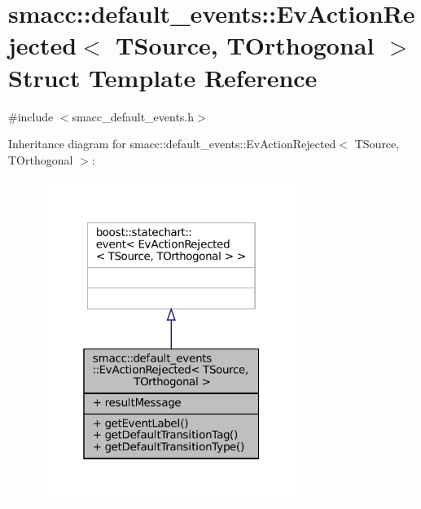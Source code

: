 \hypertarget{structsmacc_1_1default__events_1_1EvActionRejected}{}\section{smacc\+:\+:default\+\_\+events\+:\+:Ev\+Action\+Rejected$<$ T\+Source, T\+Orthogonal $>$ Struct Template Reference}
\label{structsmacc_1_1default__events_1_1EvActionRejected}


{\ttfamily \#include $<$smacc\+\_\+default\+\_\+events.\+h$>$}



Inheritance diagram for smacc\+:\+:default\+\_\+events\+:\+:Ev\+Action\+Rejected$<$ T\+Source, T\+Orthogonal $>$\+:
\nopagebreak
\begin{figure}[H]
\begin{center}
\leavevmode
\includegraphics[width=241pt]{structsmacc_1_1default__events_1_1EvActionRejected__inherit__graph}
\end{center}
\end{figure}



